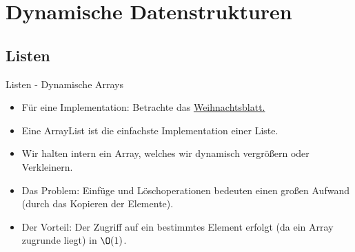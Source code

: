 \section{Dynamische Datenstrukturen}
\subsection{Listen}

\begin{frame}{Listen - Dynamische Arrays}
    \begin{itemize}[<+(1)->]
        \widei
        \item Für eine Implementation: Betrachte das \href{https://github.com/EagleoutIce/eidi-weihnachttsblatt-19_20}{Weihnachtsblatt.\textsuperscript{\faGlobe}}
        \item Eine ArrayList ist die einfachste Implementation einer Liste.
        \item Wir halten intern ein Array, welches wir dynamisch vergrößern oder Verkleinern.
        \item Das Problem: Einfüge und Löschoperationen bedeuten einen großen Aufwand (durch das Kopieren der Elemente).
        \item Der Vorteil: Der Zugriff auf ein bestimmtes Element erfolgt (da ein Array zugrunde liegt) in \(\O(1)\).
    \end{itemize}
\end{frame}

\def\Element#1{{\renewcommand{\arraystretch}{1.4}%
    \begin{tabular}{|>{\centering}p{1em}|p{1em}|}
        \hline\strut#1 & \\\hline
    \end{tabular}%
}}

\def\EndElement{{\renewcommand{\arraystretch}{1.5}%
    \begin{tabular}{|>{\centering\arraybackslash}p{1em}|}
        \hline\strut/\\\hline
    \end{tabular}
}}

